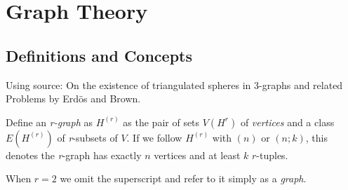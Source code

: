 \chapter{Graph Theory}

\section{Definitions and Concepts}

Using source: On the existence of triangulated spheres in 3-graphs and related Problems by Erdös and Brown.

\begin{definition}
    Define an \textit{r-graph} as $H^{(r)}$ as the pair of sets $V(H^{r})$ of \textit{vertices} and a class $E(H^{(r)})$ of \textit{r}-subsets of $V$. If we follow $H^{(r)}$ with $(n)$ or $(n;k)$, this denotes the \textit{r}-graph has exactly $n$ vertices and at least $k$ $r$-tuples.
\end{definition}

\begin{remark}
    When $r=2$ we omit the superscript and refer to it simply as a \textit{graph}.
\end{remark}

